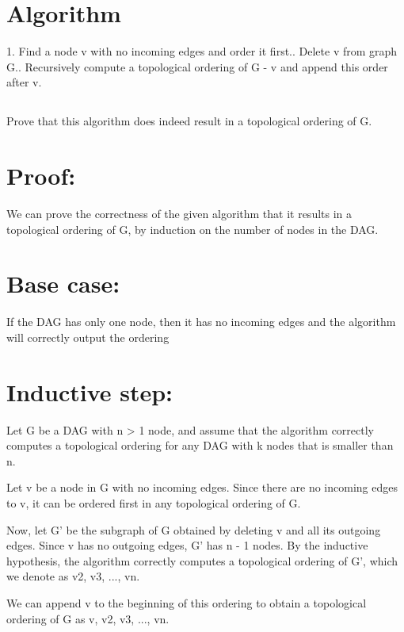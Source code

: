 \documentclass{article}
\begin{document}
\section*{\huge Algorithm}
\large 1. Find	a node v with no incoming edges	and	order it first.. Delete v	from graph G.. Recursively	compute	a topological ordering of G	- {v} and append this	order after	v.\newline\
\setcounter{section}{1}
\subsection{}
\large Prove that this	algorithm does indeed result in	a topological	ordering of	G.

\section*{\Large Proof:}
\large We can prove the correctness of the given algorithm that it results in a topological ordering of G, by induction on the number of nodes in the DAG.\newline
\section*{\large Base case:}
If the DAG has only one node, then it has no incoming edges and the algorithm will correctly output the ordering
\section*{\large Inductive step:}
Let G be a DAG with n > 1 node, and assume that the algorithm correctly computes a topological ordering for any DAG with k nodes that is smaller than n.\newline

\large Let v be a node in G with no incoming edges. Since there are no incoming edges to v, it can be ordered first in any topological ordering of G.\newline

Now, let G' be the subgraph of G obtained by deleting v and all its outgoing edges. Since v has no outgoing edges, G' has n - 1 nodes. By the inductive hypothesis, the algorithm correctly computes a topological ordering of G', which we denote as v2, v3, ..., vn.\newline

We can append v to the beginning of this ordering to obtain a topological ordering of G as v, v2, v3, ..., vn.\newline
\end{document}

